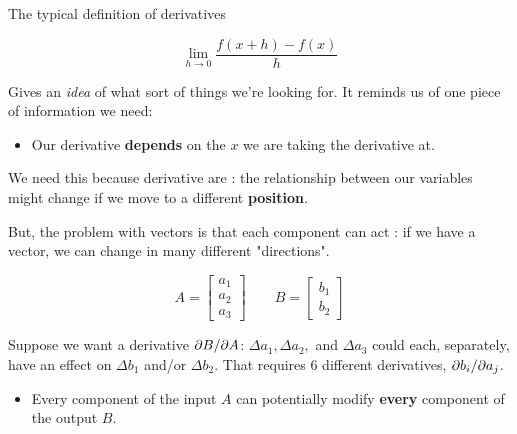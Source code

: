         The typical definition of derivatives
        
        \begin{equation}
            \lim_{h \rightarrow 0} \frac{f(x+h)-f(x)}{h}
        \end{equation}
        
        Gives an \textit{idea} of what sort of things we're looking for. It reminds us of one piece of information we need:
        
        \begin{itemize}
            \item Our derivative \textbf{depends} on the  $x$ we are taking the derivative at.
        \end{itemize}
        
        We need this because derivative are : the relationship between our variables might change if we move to a different \textbf{position}.
        
        But, the problem with vectors is that each component can act : if we have a vector, we can change in many different "directions".
        
        \begin{equation}
            A = 
            \begin{bmatrix}
                a_1 \\ a_2 \\ a_3
            \end{bmatrix}
            \qquad
            B = 
            \begin{bmatrix}
                b_1 \\ b_2
            \end{bmatrix}
        \end{equation}
        
        \miniex Suppose we want a derivative ${\partial B}/{\partial A}$: $\Delta a_1, \Delta a_2,$ and $\Delta a_3$ could each, separately, have an effect on $\Delta b_1$ and/or $\Delta b_2$. That requires 6 different derivatives, ${\partial b_i}/{\partial a_j}$.

        \begin{itemize}
            \item Every component of the input $A$ can potentially modify \textbf{every} component of the output $B$. 
        \end{itemize}
        
